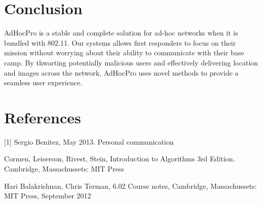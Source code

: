 \documentclass[letterpaper]{article}
\begin{document}
\section{Conclusion}

AdHocPro is a stable and complete solution for ad-hoc networks when it is bundled with 802.11. Our systems allows first responders to
focus on their mission without worrying about their ability to communicate with their base camp. By thwarting potentially malicious
users and effectively delivering location and images across the network, AdHocPro uses novel methods to provide a seamless user experience.

\section{References}

[1] Sergio Benitez, May 2013. Personal communication

\noindent[2] Cormen, Leiserson, Rivest, Stein, Introduction to Algorithms 3rd Edition. Cambridge, Massachussets: MIT Press

\noindent[3] Hari Balakrishnan, Chris Terman, 6.02 Course notes, Cambridge, Massachussets: MIT Press, September 2012
\end{document}
